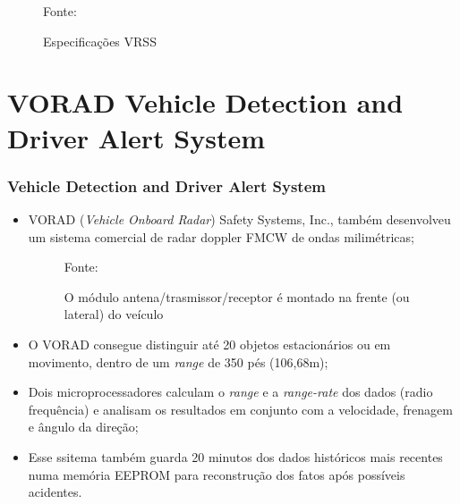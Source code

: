 \documentclass[xcolor=dvipsnames, aspectratio=169]{beamer}
\begin{document}
\begin{frame}
\begin{itemize}
\begin{figure}
            {Fonte: \cite{everett1995sensors}}
            \caption{Especificações VRSS}
            \label{fig:curva_de_freq}
        \end{figure}
	\end{itemize}
\end{frame}


\section[VORAD Vehicle Detection and Driver Alert System]{VORAD Vehicle Detection and Driver Alert System} 

\begin{frame}
\frametitle{Vehicle Detection and Driver Alert System}
	\begin{itemize}
		\item VORAD (\textit{Vehicle Onboard Radar}) Safety Systems, Inc., também desenvolveu um sistema comercial de radar doppler FMCW de ondas milimétricas;
        \begin{figure}
            \centering
            {Fonte: \cite{everett1995sensors}}
            \caption{O módulo antena/trasmissor/receptor é montado na frente (ou lateral) do veículo}
            \label{fig:curva_de_freq}
        \end{figure}
		\item O VORAD consegue distinguir até 20 objetos estacionários ou em movimento, dentro de um \textit{range} de 350 pés (106,68m);
		\item Dois microprocessadores calculam o \textit{range} e a \textit{range-rate} dos dados (radio frequência) e analisam os resultados em conjunto com a velocidade, frenagem e ângulo da direção;
		\item Esse ssitema também guarda 20 minutos dos dados históricos mais recentes numa memória EEPROM para reconstrução dos fatos após possíveis acidentes.
	\end{itemize}
\end{frame}
\end{document}
